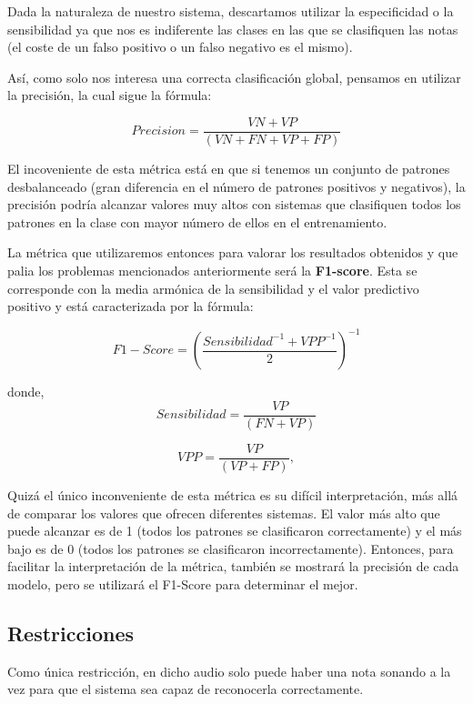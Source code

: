 \documentclass[12pt]{article}
\begin{document}
\bigskip
Dada la naturaleza de nuestro sistema, descartamos utilizar la especificidad o la sensibilidad ya que nos es indiferente las clases en las que se clasifiquen
las notas (el coste de un falso positivo o un falso negativo es el mismo).

\bigskip
Así, como solo nos interesa una correcta clasificación global, pensamos en utilizar la precisión, la cual sigue la fórmula:

\begin{equation}
	Precision = \frac{VN + VP}{(VN + FN + VP + FP)}
\end{equation}

\smallskip
El incoveniente de esta métrica está en que si tenemos un conjunto de patrones desbalanceado (gran diferencia en el número de
patrones positivos y negativos), la precisión podría alcanzar valores muy altos con sistemas que clasifiquen todos los patrones en la clase con mayor número de ellos
en el entrenamiento.

\bigskip
La métrica que utilizaremos entonces para valorar los resultados obtenidos y que palia los problemas
mencionados anteriormente será la \textbf{F1-score}. Esta se corresponde con la media armónica de la sensibilidad y el
valor predictivo positivo y está caracterizada por la fórmula: 

\begin{equation}
	F1-Score = \left(\frac{Sensibilidad^{-1} + VPP^{-1}}{2}\right)^{-1}
\end{equation}

donde, 
\begin{equation}
	Sensibilidad = \frac{VP}{(FN + VP)}
\end{equation}

\begin{equation}
	VPP = \frac{VP}{(VP + FP)}, 
\end{equation}

\smallskip
Quizá el único inconveniente de esta métrica es su difícil interpretación, más allá de comparar los valores que ofrecen diferentes sistemas.
El valor más alto que puede alcanzar es de 1 (todos los patrones se clasificaron correctamente) y el más bajo es de 0 (todos los patrones se clasificaron
incorrectamente). Entonces, para facilitar la interpretación de la métrica, también se mostrará la precisión de cada modelo, pero se utilizará
el F1-Score para determinar el mejor.

\newpage
\subsection{Restricciones}
\bigskip
Como única restricción, en dicho audio solo puede haber una nota sonando a la vez para que el sistema sea capaz de reconocerla correctamente.
\end{document}
